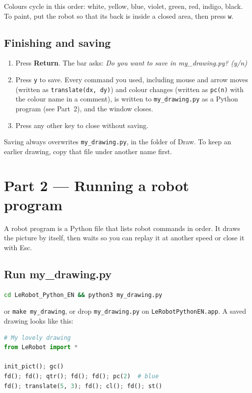 \documentclass[11pt,a4paper]{article}
\newcommand{\kbd}[1]{\texttt{#1}}
\begin{document}
Colours cycle in this order: white, yellow, blue, violet, green, red,
indigo, black. To paint, put the robot so that its back is inside a closed
area, then press \kbd{w}.

\subsection{Finishing and saving}
\begin{enumerate}
\item Press \textbf{Return}. The bar asks:
  \emph{Do you want to save in my\_drawing.py? (y/n)}
\item Press \kbd{y} to save. Every command you used, including mouse and
  arrow moves (written as \kbd{translate(dx, dy)}) and colour changes
  (written as \kbd{pc(n)} with the colour name in a comment), is written to
  \kbd{my\_drawing.py} as a Python program (see Part~2), and the window
  closes.
\item Press any other key to close without saving.
\end{enumerate}
Saving always overwrites \kbd{my\_drawing.py}, in the folder of
Draw. To keep an earlier drawing, copy that file under another name
first.

\section{Part 2 --- Running a robot program}

A robot program is a Python file that lists robot commands in order. It
draws the picture by itself, then waits so you can replay it at another
speed or close it with Esc.

\subsection{Run my\_drawing.py}
\begin{lstlisting}[language=bash]
cd LeRobot_Python_EN && python3 my_drawing.py
\end{lstlisting}
or \kbd{make my\_drawing}, or drop \kbd{my\_drawing.py} on
\kbd{LeRobotPythonEN.app}. A saved drawing looks like this:
\begin{lstlisting}[language=Python]
# My lovely drawing
from LeRobot import *

init_pict(); gc()
fd(); fd(); qtr(); fd(); fd(); pc(2)  # blue
fd(); translate(5, 3); fd(); cl(); fd(); st()
\end{lstlisting}
\end{document}
